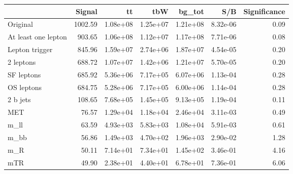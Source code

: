 \begin{tabular}{lrrrrrr}
\toprule
{} &   Signal &        tt &       tbW &    bg_tot &       S/B &  Significance \\
\midrule
Original            &  1002.59 &  1.08e+08 &  1.25e+07 &  1.21e+08 &  8.32e-06 &          0.09 \\
At least one lepton &   903.65 &  1.06e+08 &  1.12e+07 &  1.17e+08 &  7.71e-06 &          0.08 \\
Lepton trigger      &   845.96 &  1.59e+07 &  2.74e+06 &  1.87e+07 &  4.54e-05 &          0.20 \\
2 leptons           &   688.72 &  1.07e+07 &  1.42e+06 &  1.21e+07 &  5.70e-05 &          0.20 \\
SF leptons          &   685.92 &  5.36e+06 &  7.17e+05 &  6.07e+06 &  1.13e-04 &          0.28 \\
OS leptons          &   684.75 &  5.28e+06 &  7.17e+05 &  6.00e+06 &  1.14e-04 &          0.28 \\
2 b jets            &   108.65 &  7.68e+05 &  1.45e+05 &  9.13e+05 &  1.19e-04 &          0.11 \\
MET                 &    76.57 &  1.29e+04 &  1.18e+04 &  2.46e+04 &  3.11e-03 &          0.49 \\
m_ll                &    63.59 &  4.93e+03 &  5.83e+03 &  1.08e+04 &  5.91e-03 &          0.61 \\
m_bb                &    56.86 &  1.49e+03 &  4.70e+02 &  1.96e+03 &  2.90e-02 &          1.28 \\
m_R                 &    50.11 &  7.14e+01 &  7.34e+01 &  1.45e+02 &  3.46e-01 &          4.16 \\
mTR                 &    49.90 &  2.38e+01 &  4.40e+01 &  6.78e+01 &  7.36e-01 &          6.06 \\
\bottomrule
\end{tabular}
